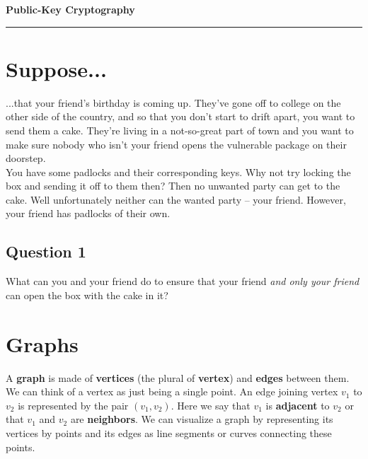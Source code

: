 \documentclass[12pt]{article}
\begin{document}
\begin{center}
{\bf \Large Public-Key Cryptography}
\vspace{0.2cm}
\hrule
\end{center}

\section*{Suppose...}
...that your friend's birthday is coming up. They've gone off to college on the other side of the country, and so that you don't start to drift apart, you want to send them a cake. They're living in a not-so-great part of town and you want to make sure nobody who isn't your friend opens the vulnerable package on their doorstep.\\

\noindent You have some padlocks and their corresponding keys. Why not try locking the box and sending it off to them then? Then no unwanted party can get to the cake. Well unfortunately neither can the wanted party -- your friend. However, your friend has padlocks of their own.

\subsection*{Question 1}
What can you and your friend do to ensure that your friend \textit{and only your friend} can open the box with the cake in it?

\vspace{3cm}

\section*{Graphs}
A \textbf{graph} is made of \textbf{vertices} (the plural of \textbf{vertex}) and \textbf{edges} between them. We can think of a vertex as just being a single point. An edge joining vertex $v_1$ to $v_2$ is represented by the pair $(v_1, v_2)$. Here we say that $v_1$ is \textbf{adjacent} to $v_2$ or that $v_1$ and $v_2$ are \textbf{neighbors}. We can visualize a graph by representing its vertices by points and its edges as line segments or curves connecting these points.\\
\end{document}
